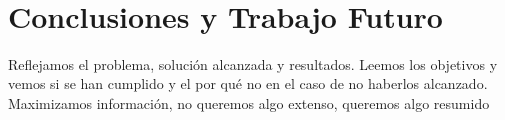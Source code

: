 \newpage
~
\newpage
\chapter{Conclusiones y Trabajo Futuro}
Reflejamos el problema, solución alcanzada y resultados.
Leemos los objetivos y vemos si se han cumplido y el por qué no en el caso de no haberlos alcanzado. 
Maximizamos información, no queremos algo extenso, queremos algo resumido
